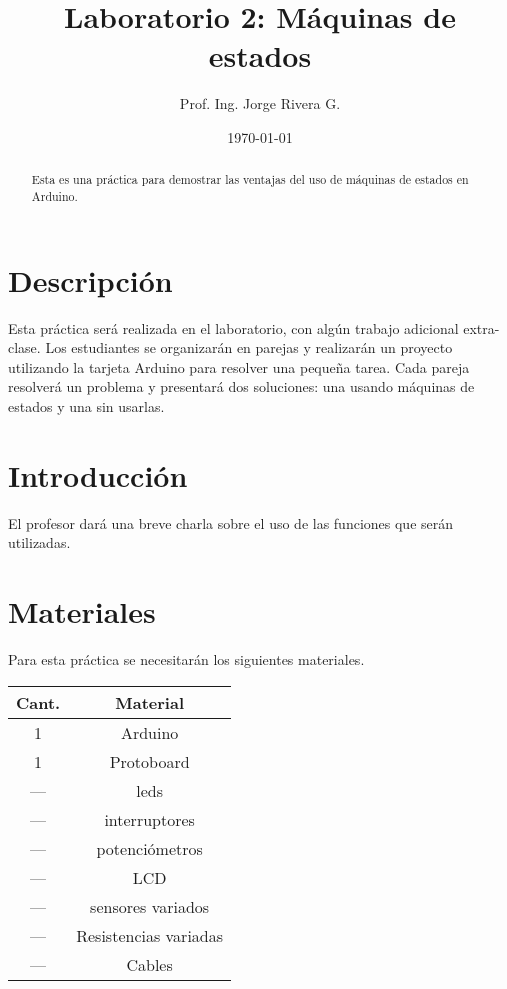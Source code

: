\documentclass[12pt,letterpaper]{IEEEtran}
\title{Laboratorio 2: Máquinas de estados}
\author{Prof. Ing. Jorge Rivera G.}
\date{\today}
\begin{document}

\renewcommand{\leftmark}{UNIVERSIDAD LATINA DE COSTA RICA -- BINGE-61 MICROCONTROLADORES}

\maketitle


\begin{abstract}
Esta es una práctica para demostrar las ventajas del uso de máquinas de estados en Arduino. 
\end{abstract}
\section{Descripción}

Esta práctica será realizada en el laboratorio, con algún trabajo adicional extra-clase. Los estudiantes se organizarán en parejas y realizarán un proyecto utilizando la tarjeta Arduino para resolver una pequeña tarea. Cada pareja resolverá un problema y presentará dos soluciones: una usando máquinas de estados y una sin usarlas.


\section{Introducción}

El profesor dará una breve charla sobre el uso de las funciones que serán utilizadas.

\section{Materiales}

Para esta práctica se necesitarán los siguientes materiales.

\begin{center}
\begin{tabular}{c|c}\hline
	Cant. & \hspace{2cm}Material\hspace{2cm} \\\hline\hline
	1 	& Arduino 		\\\hline
	1	& Protoboard 	\\\hline	
	---	& leds			\\\hline
	--- & interruptores		\\\hline
	--- & potenciómetros	\\\hline
	--- & LCD \\\hline
	--- & sensores variados \\\hline
	---	& Resistencias variadas \\\hline
	--- & Cables		\\\hline
\end{tabular}
\end{center}
\end{document}
